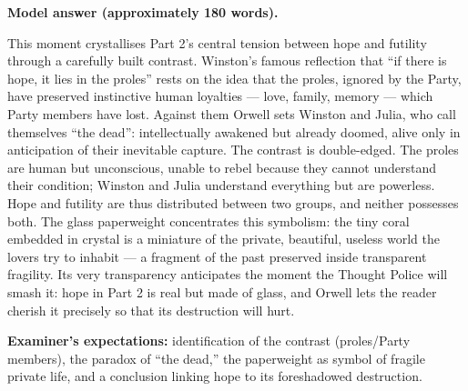\documentclass[11pt]{article}
\begin{document}
\begin{corrige}
\textbf{Model answer (approximately 180 words).}

This moment crystallises Part 2's central tension between hope and futility through a carefully built contrast. Winston's famous reflection that ``if there is hope, it lies in the proles'' rests on the idea that the proles, ignored by the Party, have preserved instinctive human loyalties --- love, family, memory --- which Party members have lost. Against them Orwell sets Winston and Julia, who call themselves ``the dead'': intellectually awakened but already doomed, alive only in anticipation of their inevitable capture. The contrast is double-edged. The proles are human but unconscious, unable to rebel because they cannot understand their condition; Winston and Julia understand everything but are powerless. Hope and futility are thus distributed between two groups, and neither possesses both. The glass paperweight concentrates this symbolism: the tiny coral embedded in crystal is a miniature of the private, beautiful, useless world the lovers try to inhabit --- a fragment of the past preserved inside transparent fragility. Its very transparency anticipates the moment the Thought Police will smash it: hope in Part 2 is real but made of glass, and Orwell lets the reader cherish it precisely so that its destruction will hurt.

\textbf{Examiner's expectations:} identification of the contrast (proles/Party members), the paradox of ``the dead,'' the paperweight as symbol of fragile private life, and a conclusion linking hope to its foreshadowed destruction.
\end{corrige}
\end{document}
